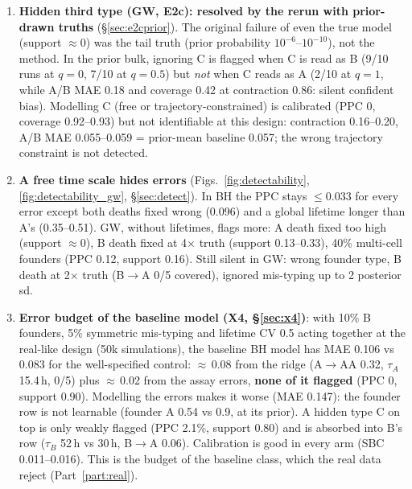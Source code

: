 \documentclass[10pt,a4paper]{article}
\newcommand{\tA}{$\tau_A$}
\newcommand{\tB}{$\tau_B$}
\begin{document}
\begin{enumerate}[resume,leftmargin=1.4em]
\item \textbf{Hidden third type (GW, E2c): resolved by the rerun with prior-drawn truths} (\S\ref{sec:e2cprior}). The original failure of even the true model (support $\approx 0$) was the tail truth (prior probability $10^{-6}$--$10^{-10}$), not the method. In the prior bulk, ignoring C is flagged when C is read as B (9/10 runs at $q=0$, 7/10 at $q=0.5$) but \emph{not} when C reads as A (2/10 at $q=1$, while A/B MAE 0.18 and coverage 0.42 at contraction 0.86: silent confident bias). Modelling C (free or trajectory-constrained) is calibrated (PPC 0, coverage 0.92--0.93) but not identifiable at this design: contraction 0.16--0.20, A/B MAE 0.055--0.059 = prior-mean baseline 0.057; the wrong trajectory constraint is not detected.
\item \textbf{A free time scale hides errors} (Figs.~\ref{fig:detectability}, \ref{fig:detectability_gw}, \S\ref{sec:detect}). In BH the PPC stays $\le 0.033$ for every error except both deaths fixed wrong (0.096) and a global lifetime longer than A's (0.35--0.51). GW, without lifetimes, flags more: A death fixed too high (support $\approx 0$), B death fixed at 4$\times$ truth (support 0.13--0.33), 40\% multi-cell founders (PPC 0.12, support 0.16). Still silent in GW: wrong founder type, B death at 2$\times$ truth (B$\to$A 0/5 covered), ignored mis-typing up to 2 posterior sd.
\item \textbf{Error budget of the baseline model (X4, \S\ref{sec:x4})}: with 10\% B founders, 5\% symmetric mis-typing and lifetime CV 0.5 acting together at the real-like design (50k simulations), the baseline BH model has MAE 0.106 vs 0.083 for the well-specified control: $\approx$\,0.08 from the ridge (A$\to$AA 0.32, \tA{} 15.4\,h, 0/5) plus $\approx$\,0.02 from the assay errors, \textbf{none of it flagged} (PPC 0, support 0.90). Modelling the errors makes it worse (MAE 0.147): the founder row is not learnable (founder A 0.54 vs 0.9, at its prior). A hidden type C on top is only weakly flagged (PPC 2.1\%, support 0.80) and is absorbed into B's row (\tB{} 52\,h vs 30\,h, B$\to$A 0.06). Calibration is good in every arm (SBC 0.011--0.016). This is the budget of the baseline class, which the real data reject (Part~\ref{part:real}).
\end{enumerate}
\end{document}

